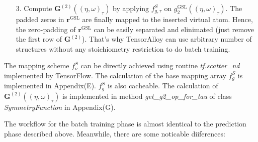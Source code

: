 \documentclass[preprint]{revtex4-2}
\begin{document}
\begin{itemize}
\begin{itemize}
    \end{itemize}
    
    \item[3.]
    Compute $\mathbf{G}^{(2)}((\eta, \omega)_{\tau})$ by applying 
    $f_{g,\tau}^{S}$ on $g^{\mathrm{GSL}}_{2}((\eta, \omega)_{\tau})$. The 
    padded zeros in $\mathbf{r}^{\mathrm{GSL}}$ are finally mapped to the 
    inserted virtual atom. Hence, the zero-padding of 
    $\mathbf{r}^{\mathrm{GSL}}$ can be easily separated and elinimated (just 
    remove the first row of $\mathbf{G}^{(2)}$). That's why TensorAlloy can use
    arbitrary number of structures without any stoichiometry restriction to do 
    batch training.

\end{itemize}

The mapping scheme $f_{\nu}^{S}$ can be directly achieved using routine 
\textit{tf.scatter\_nd} implemented by TensorFlow. The calculation of the base 
mapping array $f_{g}^{S}$ is implemented in Appendix(E). $f_{g}^{S}$ is also 
cacheable. The calculation of $\mathbf{G}^{(2)}((\eta, \omega)_{\tau})$ is 
implemented in method \textit{get\_g2\_op\_for\_tau} of class 
\textit{SymmetryFunction} in Appendix(G).

The workflow for the batch training phase is almost identical to the prediction 
phase described above. Meanwhile, there are some noticable diiferences:
\end{document}
